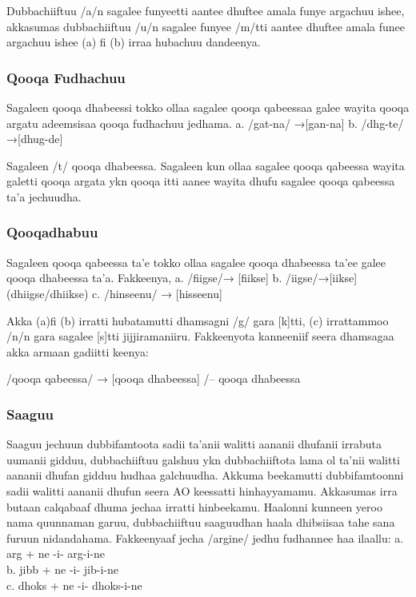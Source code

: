 \documentclass[11pt,b5paper]{book}
\begin{document}
\begin{itemize}
Dubbachiiftuu /a/n sagalee funyeetti aantee dhuftee amala  funye argachuu ishee, akkasumas dubbachiiftuu /u/n sagalee  funyee /m/tti aantee dhuftee amala funee argachuu ishee (a) fi  (b) irraa hubachuu dandeenya. 

\subsubsection{Qooqa Fudhachuu}

Sagaleen qooqa dhabeessi tokko ollaa sagalee qooqa qabeessaa  galee wayita qooqa argatu adeemsisaa qooqa fudhachuu  jedhama.  \newline
a. /gat-na/ →[gan-na]  \newline
b. /dhg-te/→[dhug-de]  

Sagaleen /t/ qooqa dhabeessa. Sagaleen kun ollaa sagalee  qooqa qabeessa wayita galetti qooqa argata ykn qooqa itti aanee wayita dhufu sagalee qooqa qabeessa ta’a jechuudha. 

\subsubsection{Qooqadhabuu}

Sagaleen qooqa qabeessa ta’e tokko ollaa sagalee qooqa  dhabeessa ta’ee galee qooqa dhabeessa ta’a. Fakkeenya,  \newline
a. /fiigse/→ [fiikse]  \newline
b. /iigse/→[iikse]  (dhiigse/dhiikse)\newline
c. /hinseenu/ → [hisseenu]  

Akka (a)fi (b) irratti hubatamutti dhamsagni /g/ gara [k]tti, (c)  irrattammoo /n/n gara sagalee [s]tti jijjiramaniiru.  Fakkeenyota kanneeniif seera dhamsagaa akka armaan gadiitti  keenya: 


/qooqa qabeessa/ → [qooqa dhabeessa] /-- qooqa dhabeessa 

\subsubsection{Saaguu}

Saaguu jechuun dubbifamtoota sadii ta’anii walitti aananii  dhufanii irrabuta uumanii gidduu, dubbachiiftuu galshuu ykn  dubbachiiftota lama ol ta’nii walitti aananii dhufan gidduu  hudhaa galchuudha. Akkuma beekamutti dubbifamtoonni sadii  walitti aananii dhufun seera AO keessatti  hinhayyamamu. Akkasumas irra butaan calqabaaf dhuma  jechaa irratti hinbeekamu. Haalonni kunneen yeroo nama  quunnaman garuu, dubbachiiftuu saaguudhan haala dhibsiisaa  tahe sana furuun nidandahama. Fakkeenyaaf jecha /argine/ jedhu fudhannee haa ilaallu:\newline
a. arg + ne -i- arg-i-ne \\
b. jibb + ne -i- jib-i-ne \\
c. dhoks + ne -i- dhoks-i-ne 


\end{itemize}
\end{document}
